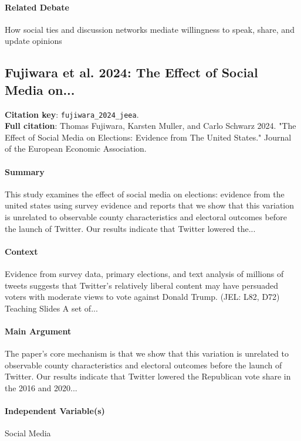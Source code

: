 \documentclass[12pt]{article}
\begin{document}
\paragraph{Related Debate} How social ties and discussion networks mediate willingness to speak, share, and update opinions


\subsection{Fujiwara et al. 2024: The Effect of Social Media on...}
\textbf{Citation key}: \texttt{fujiwara\_2024\_jeea}.\\
\textbf{Full citation}: Thomas Fujiwara, Karsten Muller, and Carlo Schwarz 2024. "The Effect of Social Media on Elections: Evidence from The United States." Journal of the European Economic Association.

\paragraph{Summary} This study examines the effect of social media on elections: evidence from the united states using survey evidence and reports that we show that this variation is unrelated to observable county characteristics and electoral outcomes before the launch of Twitter. Our results indicate that Twitter lowered the...

\paragraph{Context} Evidence from survey data, primary elections, and text analysis of millions of tweets suggests that Twitter's relatively liberal content may have persuaded voters with moderate views to vote against Donald Trump. (JEL: L82, D72) Teaching Slides A set of...

\paragraph{Main Argument} The paper's core mechanism is that we show that this variation is unrelated to observable county characteristics and electoral outcomes before the launch of Twitter. Our results indicate that Twitter lowered the Republican vote share in the 2016 and 2020...

\paragraph{Independent Variable(s)} Social Media
\end{document}
